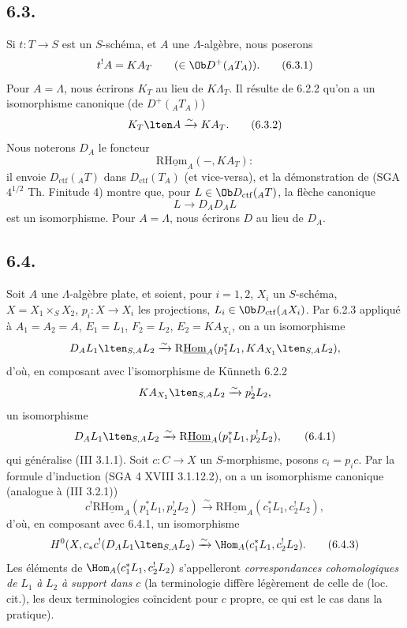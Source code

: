 \subsection*{6.3.}
Si $t:T\to S$ est un $S$-schéma, et $A$ une $\Lambda$-algèbre, nous poserons
\begin{equation}
t^!A = KA_T \qquad(\in\Ob D^+({}_AT_A)).
\tag{6.3.1}
\end{equation}
Pour $A=\Lambda$, nous écrirons $K_T$ au lieu de $K\Lambda_T$. Il résulte de 6.2.2 qu'on a un isomorphisme canonique (de $D^+({}_AT_A)$)
\begin{equation}
K_T\lten A\xrightarrow{\sim}KA_T.
\tag{6.3.2}
\end{equation}
Nous noterons $D_A$ le foncteur
\[
\mathrm{R}\underline{\mathrm{Hom}}_A(-,KA_T) :
\]
il envoie $D_{\mathrm{ctf}}({}_AT)$ dans $D_{\mathrm{ctf}}(T_A)$ (et vice-versa), et la démonstration de (SGA $4^{1/2}$ Th. Finitude 4) montre que, pour $L\in\Ob D_{\mathrm{ctf}}({}_AT)$, la flèche canonique
\[
L\longrightarrow D_AD_AL
\]
est un isomorphisme. Pour $A=\Lambda$, nous écrirons $D$ au lieu de $D_A$.

\subsection*{6.4.}
Soit $A$ une $\Lambda$-algèbre plate, et soient, pour $i=1,2$, $X_i$ un $S$-schéma, $X=X_1\times_SX_2$, $p_i:X\to X_i$ les projections, $L_i\in\Ob D_{\mathrm{ctf}}({}_AX_i)$. Par 6.2.3 appliqué à $A_1=A_2=A$, $E_1=L_1$, $F_2=L_2$, $E_2=KA_{X_1}$, on a un isomorphisme
\[
D_A L_1\lten_{S,A}L_2
\xrightarrow{\sim}
\mathrm{R}\underline{\mathrm{Hom}}_A(p_1^*L_1,KA_{X_1}\lten_{S,A}L_2),
\]
d'où, en composant avec l'isomorphisme de Künneth 6.2.2
\[
KA_{X_1}\lten_{S,A}L_2\xrightarrow{\sim}p_2^!L_2,
\]
un isomorphisme
\begin{equation}
D_AL_1\lten_{S,A}L_2
\xrightarrow{\sim}
\mathrm{R}\underline{\mathrm{Hom}}_A(p_1^*L_1,p_2^!L_2),
\tag{6.4.1}
\end{equation}
qui généralise (III 3.1.1). Soit $c:C\to X$ un $S$-morphisme, posons $c_i=p_ic$. Par la formule d'induction (SGA 4 XVIII 3.1.12.2), on a un isomorphisme canonique (analogue à (III 3.2.1))
\begin{equation}
c^!\mathrm{R}\underline{\mathrm{Hom}}_A(p_1^*L_1,p_2^!L_2)
\xrightarrow{\sim}
\mathrm{R}\underline{\mathrm{Hom}}_A(c_1^*L_1,c_2^!L_2),
\tag{6.4.2}
\end{equation}
d'où, en composant avec 6.4.1, un isomorphisme
\begin{equation}
H^0(X,c_*c^!(D_AL_1\lten_{S,A}L_2)
\xrightarrow{\sim}
\Hom_A(c_1^*L_1,c_2^!L_2).
\tag{6.4.3}
\end{equation}
Les éléments de $\Hom_A(c_1^*L_1,c_2^!L_2)$ s'appelleront \emph{correspondances cohomologiques de} $L_1$ \emph{à} $L_2$ \emph{à support dans} $c$ (la terminologie diffère légèrement de celle de (loc. cit.), les deux terminologies coïncident pour $c$ propre, ce qui est le cas dans la pratique).

